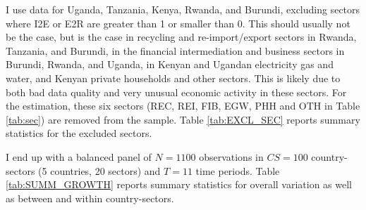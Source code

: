 \documentclass[a4paper]{article}
\begin{document}
I use data for Uganda, Tanzania, Kenya, Rwanda, and Burundi, excluding sectors where I2E or E2R are greater than 1 or smaller than 0. This should usually not be the case, but is the case in recycling and re-import/export sectors in Rwanda, Tanzania, and Burundi, in the financial intermediation and business sectors in Burundi, Rwanda, and Uganda, in Kenyan and Ugandan electricity gas and water, and Kenyan private households and other sectors. This is likely due to both bad data quality and very unusual economic activity in these sectors. For the estimation, these six sectors (REC, REI, FIB, EGW, PHH and OTH in Table \ref{tab:sec}) are removed from the sample. %
Table \ref{tab:EXCL_SEC} reports summary statistics for the excluded sectors. \newline

I end up with a balanced panel of $N = 1100$ observations in $CS = 100$ country-sectors (5 countries, 20 sectors) and $T = 11$ time periods. Table \ref{tab:SUMM_GROWTH} reports summary statistics for overall variation as well as between and within country-sectors. %
\end{document}
